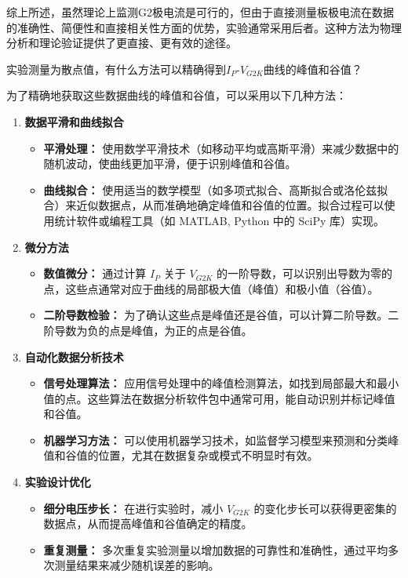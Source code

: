 \documentclass[dvipsnames, svgnames,a4paper,11pt]{article}
\begin{document}
	综上所述，虽然理论上监测G2极电流是可行的，但由于直接测量板极电流在数据的准确性、简便性和直接相关性方面的优势，实验通常采用后者。这种方法为物理分析和理论验证提供了更直接、更有效的途径。
	
	
	\begin{question}
		实验测量为散点值，有什么方法可以精确得到$I_P$-$V_{G2K}$曲线的峰值和谷值？
	\end{question}
	为了精确地获取这些数据曲线的峰值和谷值，可以采用以下几种方法：	
	\begin{enumerate}
		\item \textbf{数据平滑和曲线拟合}
		
		\begin{itemize}
			\item \textbf{平滑处理：} 使用数学平滑技术（如移动平均或高斯平滑）来减少数据中的随机波动，使曲线更加平滑，便于识别峰值和谷值。
			\item \textbf{曲线拟合：} 使用适当的数学模型（如多项式拟合、高斯拟合或洛伦兹拟合）来近似数据点，从而准确地确定峰值和谷值的位置。拟合过程可以使用统计软件或编程工具（如 MATLAB, Python 中的 SciPy 库）实现。
		\end{itemize}
		
		\item \textbf{微分方法}
		
		\begin{itemize}
			\item \textbf{数值微分：} 通过计算 \( I_P \) 关于 \( V_{G2K} \) 的一阶导数，可以识别出导数为零的点，这些点通常对应于曲线的局部极大值（峰值）和极小值（谷值）。
			\item \textbf{二阶导数检验：} 为了确认这些点是峰值还是谷值，可以计算二阶导数。二阶导数为负的点是峰值，为正的点是谷值。
		\end{itemize}
		
		\item \textbf{自动化数据分析技术}
		
		\begin{itemize}
			\item \textbf{信号处理算法：} 应用信号处理中的峰值检测算法，如找到局部最大和最小值的点。这些算法在数据分析软件包中通常可用，能自动识别并标记峰值和谷值。
			\item \textbf{机器学习方法：} 可以使用机器学习技术，如监督学习模型来预测和分类峰值和谷值的位置，尤其在数据复杂或模式不明显时有效。
		\end{itemize}
		
		\item \textbf{实验设计优化}
		
		\begin{itemize}
			\item \textbf{细分电压步长：} 在进行实验时，减小 \( V_{G2K} \) 的变化步长可以获得更密集的数据点，从而提高峰值和谷值确定的精度。
			\item \textbf{重复测量：} 多次重复实验测量以增加数据的可靠性和准确性，通过平均多次测量结果来减少随机误差的影响。
		\end{itemize}
	\end{enumerate}
	
\end{document}
